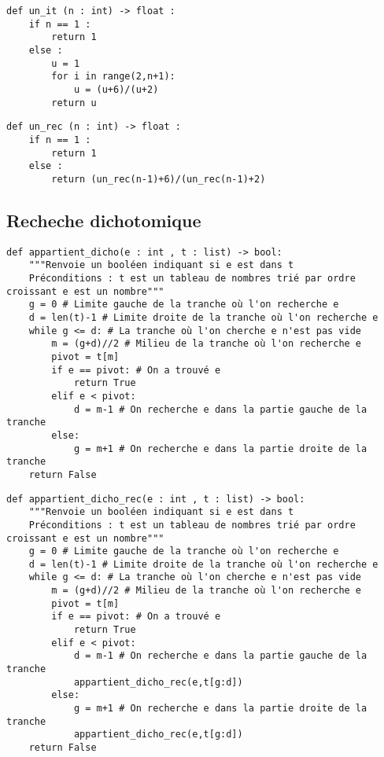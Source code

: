 \noindent\begin{minipage}[c]{.45\linewidth}
\begin{lstlisting}
def un_it (n : int) -> float :
    if n == 1 :
        return 1
    else : 
        u = 1
        for i in range(2,n+1):
            u = (u+6)/(u+2)
        return u
\end{lstlisting}
\end{minipage} \hfill
\begin{minipage}[c]{.45\linewidth}
\begin{lstlisting}
def un_rec (n : int) -> float :
    if n == 1 :
        return 1
    else : 
        return (un_rec(n-1)+6)/(un_rec(n-1)+2)
\end{lstlisting}
\end{minipage} 

\subsection{Recheche dichotomique}
\begin{lstlisting}
def appartient_dicho(e : int , t : list) -> bool:
    """Renvoie un booléen indiquant si e est dans t
    Préconditions : t est un tableau de nombres trié par ordre croissant e est un nombre"""
    g = 0 # Limite gauche de la tranche où l'on recherche e
    d = len(t)-1 # Limite droite de la tranche où l'on recherche e
    while g <= d: # La tranche où l'on cherche e n'est pas vide
        m = (g+d)//2 # Milieu de la tranche où l'on recherche e
        pivot = t[m]
        if e == pivot: # On a trouvé e
            return True
        elif e < pivot:
            d = m-1 # On recherche e dans la partie gauche de la tranche
        else:
            g = m+1 # On recherche e dans la partie droite de la tranche
    return False
\end{lstlisting}

\begin{lstlisting}
def appartient_dicho_rec(e : int , t : list) -> bool:
    """Renvoie un booléen indiquant si e est dans t
    Préconditions : t est un tableau de nombres trié par ordre croissant e est un nombre"""
    g = 0 # Limite gauche de la tranche où l'on recherche e
    d = len(t)-1 # Limite droite de la tranche où l'on recherche e
    while g <= d: # La tranche où l'on cherche e n'est pas vide
        m = (g+d)//2 # Milieu de la tranche où l'on recherche e
        pivot = t[m]
        if e == pivot: # On a trouvé e
            return True
        elif e < pivot:
            d = m-1 # On recherche e dans la partie gauche de la tranche
            appartient_dicho_rec(e,t[g:d])
        else:
            g = m+1 # On recherche e dans la partie droite de la tranche
            appartient_dicho_rec(e,t[g:d])
    return False
\end{lstlisting}

